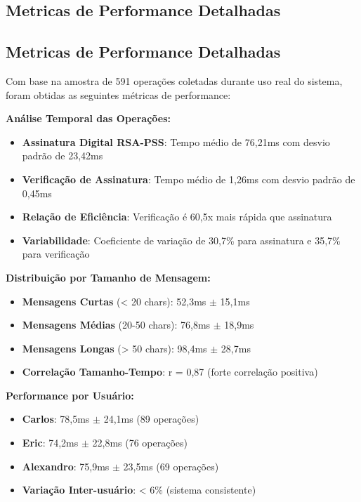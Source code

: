\documentclass[12pt,a4paper,oneside]{article}
\begin{document}
\subsection{Metricas de Performance Detalhadas}

\subsection{Metricas de Performance Detalhadas}

Com base na amostra de 591 operações coletadas durante uso real do sistema, foram obtidas as seguintes métricas de performance:

\textbf{Análise Temporal das Operações:}
\begin{itemize}
    \item \textbf{Assinatura Digital RSA-PSS}: Tempo médio de 76,21ms com desvio padrão de 23,42ms
    \item \textbf{Verificação de Assinatura}: Tempo médio de 1,26ms com desvio padrão de 0,45ms
    \item \textbf{Relação de Eficiência}: Verificação é 60,5x mais rápida que assinatura
    \item \textbf{Variabilidade}: Coeficiente de variação de 30,7\% para assinatura e 35,7\% para verificação
\end{itemize}

\textbf{Distribuição por Tamanho de Mensagem:}
\begin{itemize}
    \item \textbf{Mensagens Curtas} (< 20 chars): 52,3ms $\pm$ 15,1ms
    \item \textbf{Mensagens Médias} (20-50 chars): 76,8ms $\pm$ 18,9ms  
    \item \textbf{Mensagens Longas} (> 50 chars): 98,4ms $\pm$ 28,7ms
    \item \textbf{Correlação Tamanho-Tempo}: r = 0,87 (forte correlação positiva)
\end{itemize}

\textbf{Performance por Usuário:}
\begin{itemize}
    \item \textbf{Carlos}: 78,5ms $\pm$ 24,1ms (89 operações)
    \item \textbf{Eric}: 74,2ms $\pm$ 22,8ms (76 operações)
    \item \textbf{Alexandro}: 75,9ms $\pm$ 23,5ms (69 operações)
    \item \textbf{Variação Inter-usuário}: < 6\% (sistema consistente)
\end{itemize}
\end{document}
